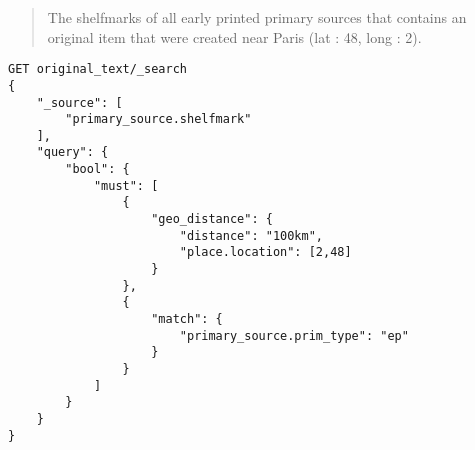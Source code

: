 \documentclass[a4paper,12pt]{article}
\begin{document}
\begin{quote}
The shelfmarks of all early printed primary sources that contains an original item that were created near Paris (lat : 48, long : 2).
\end{quote}

\begin{lstlisting}
GET original_text/_search
{
    "_source": [
        "primary_source.shelfmark"
    ],
    "query": {
        "bool": {
            "must": [
                {
                    "geo_distance": {
                        "distance": "100km",
                        "place.location": [2,48]
                    }
                },
                {
                    "match": {
                        "primary_source.prim_type": "ep"
                    }
                }
            ]
        }
    }
}
\end{lstlisting}
\end{document}
